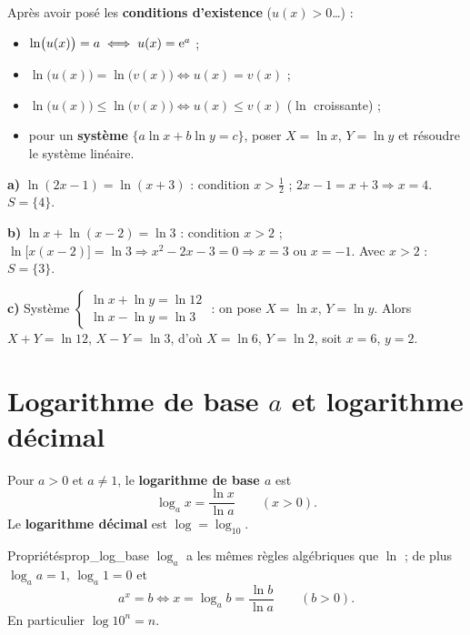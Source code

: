 \begin{methode}
	Après avoir posé les \textbf{conditions d'existence} ($u(x)>0$\ldots) :
	\begin{itemize}[label=\textbullet]
		\item $\ln\bigl(u(x)\bigr)=a \iff u(x)=\mathrm{e}^{a}$ ;
		\item $\ln\bigl(u(x)\bigr)=\ln\bigl(v(x)\bigr) \iff u(x)=v(x)$ ;
		\item $\ln\bigl(u(x)\bigr)\leq\ln\bigl(v(x)\bigr) \iff u(x)\leq v(x)$
		($\ln$ croissante) ;
		\item pour un \textbf{système} $\{a\ln x+b\ln y=c\}$, poser
		$X=\ln x$, $Y=\ln y$ et résoudre le système linéaire.
	\end{itemize}
\end{methode}

\begin{exemple}
	\textbf{a)} $\ln(2x-1)=\ln(x+3)$ : condition $x>\tfrac12$ ;
	$2x-1=x+3\Rightarrow x=4$. \; $S=\{4\}$.

	\textbf{b)} $\ln x+\ln(x-2)=\ln 3$ : condition $x>2$ ;
	$\ln\bigl[x(x-2)\bigr]=\ln 3\Rightarrow x^{2}-2x-3=0\Rightarrow x=3$
	ou $x=-1$. Avec $x>2$ : $S=\{3\}$.

	\textbf{c)} Système
	$\begin{cases}\ln x+\ln y=\ln 12\\ \ln x-\ln y=\ln 3\end{cases}$ :
	on pose $X=\ln x$, $Y=\ln y$. Alors $X+Y=\ln 12$, $X-Y=\ln 3$, d'où
	$X=\ln 6$, $Y=\ln 2$, soit $x=6$, $y=2$.
\end{exemple}


\section{Logarithme de base \texorpdfstring{$a$}{a} et logarithme décimal}

\begin{definition}
	Pour $a>0$ et $a\neq 1$, le \textbf{logarithme de base $a$} est
	\[
	\log_a x=\frac{\ln x}{\ln a}\qquad (x>0).
	\]
	Le \textbf{logarithme décimal} est $\log=\log_{10}$.
\end{definition}

\begin{propriete}{Propriétés}{prop_log_base}
	$\log_a$ a les mêmes règles algébriques que $\ln$ ; de plus
	$\log_a a=1$, $\log_a 1=0$ et
	\[
	a^{x}=b \iff x=\log_a b=\frac{\ln b}{\ln a}\qquad (b>0).
	\]
	En particulier $\log 10^{n}=n$.
\end{propriete}

